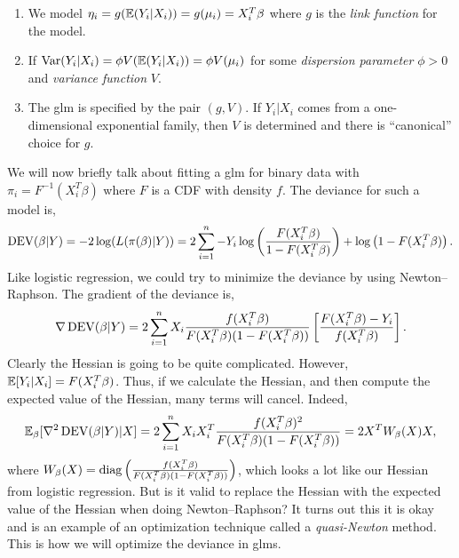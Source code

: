 \begin{enumerate}
    \item We  model $\eta_i = g({\mathbb{E}}(Y_i|X_i))=g(\mu_i)  =X_i^T\beta$ where $g$  is the \emph{link function} for the model.
    \item If  $\operatorname{Var}(Y_i|X_i)=\phi V({\mathbb{E}}(Y_i|X_i))=\phi V(\mu_i)$ for  some  \emph{dispersion parameter}  $\phi>0$ and \emph{variance function} $V$.
    \item The glm is specified by the pair  $(g,V)$. If   $Y_i|X_i$  comes  from  a  one-dimensional exponential family, then $V$  is  determined and there is ``canonical'' choice  for $g$.
\end{enumerate}

We will now briefly talk about fitting a glm for binary data with $\pi_i = F^{-1}(X_i^T\beta)$ where $F$ is a CDF with density  $f$. The deviance for such a  model is,
\[\operatorname{DEV}(\beta|Y)=-2\log(L(\pi(\beta)|Y)) = 2\sum_{i=1}^n-Y_i\log\left(\frac{F(X_i^T\beta)}{1-F(X_i^T\beta)}\right)+\log\left(1-F(X_i^T\beta)\right).  \]
Like logistic regression, we could try to minimize  the deviance by using Newton--Raphson. The gradient of the deviance is,
\[\nabla \operatorname{DEV}(\beta|Y) = 2\sum_{i=1}^n X_i  \frac{f(X_i^T\beta)}{F(X_i^T\beta)(1-F(X_i^T\beta))}\left[
    \frac{F(X_i^T\beta)-Y_i}{f(X_i^T\beta)}
\right]. \]
Clearly  the Hessian is going to  be quite  complicated. However, ${\mathbb{E}}[Y_i|X_i]  = F(X_i^T\beta)$.  Thus,  if we calculate the Hessian, and then  compute the expected value of the Hessian, many terms will cancel.  Indeed,
\[{\mathbb{E}}_{\beta}[\nabla^2\operatorname{DEV}(\beta|Y)|X] =  2\sum_{i=1}^n  X_iX_i^T\frac{f(X_i^T\beta)^2}{F(X_i^T\beta)(1-F(X_i^T\beta))} = 2X^TW_\beta(X)  X,  \]
where $W_\beta(X)  =  \operatorname{diag}\left(
    \frac{f(X_i^T\beta)}{F(X_i^T\beta)(1-F(X_i^T\beta))}
\right)$, which looks a lot like our Hessian from  logistic regression. But is it valid to replace the Hessian with the expected value of the Hessian when doing Newton--Raphson?  It turns  out this it is okay and is an example of an optimization technique called a \emph{quasi-Newton}  method.  This is how we will optimize the deviance in glms. 
